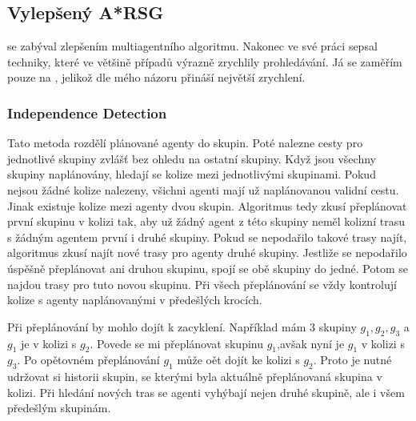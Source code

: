 \subsection{Vylepšený A*RSG}\label{subsec:vylepseny_hromadny_a_star}

\citep{Standley_2010} se zabýval zlepšením multiagentního  algoritmu.
Nakonec ve své práci \citet*{Standley_2010} sepsal techniky, které ve většině případů výrazně zrychlily prohledávání.
Já se zaměřím pouze na ,
jelikož dle mého názoru přináší největší zrychlení.

\subsubsection{Independence Detection}\label{subsubsec:varsg_independence_detection}

Tato metoda rozdělí plánované agenty do skupin.
Poté nalezne cesty pro jednotlivé skupiny zvlášť bez ohledu na ostatní skupiny.
Když jsou všechny skupiny naplánovány, hledají se kolize mezi jednotlivými skupinami.
Pokud nejsou žádné kolize nalezeny, všichni agenti mají už naplánovanou validní cestu.
Jinak existuje kolize mezi agenty dvou skupin.
Algoritmus tedy zkusí přeplánovat první skupinu v kolizi tak,
aby už žádný agent z této skupiny neměl kolizní trasu s žádným agentem první i druhé skupiny.
Pokud se nepodařilo takové trasy najít, algoritmus zkusí najít nové trasy pro agenty druhé skupiny.
Jestliže se nepodařilo úspěšně přeplánovat ani druhou skupinu, spojí se obě skupiny do jedné.
Potom se najdou trasy pro tuto novou skupinu.
Při všech přeplánování se vždy kontrolují kolize s agenty naplánovanými v předešlých krocích.

Při přeplánování by mohlo dojít k zacyklení.
Například mám $3$ skupiny $g_1, g_2, g_3$ a $g_1$ je v kolizi s $g_2$.
Povede se mi přeplánovat skupinu $g_1$,avšak nyní je $g_1$ v kolizi s $g_3$.
Po opětovném přeplánování $g_1$ může oět dojít ke kolizi s $g_2$.
Proto je nutné udržovat si historii skupin, se kterými byla aktuálně přeplánovaná skupina v kolizi.
Při hledání nových tras se agenti vyhýbají nejen druhé skupině, ale i všem předešlým skupinám.

